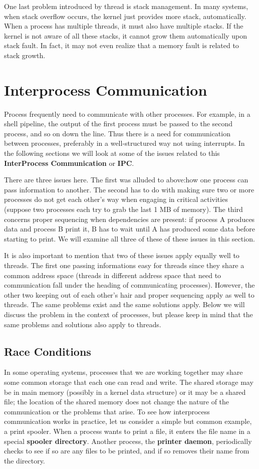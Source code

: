 \documentclass{book}
\newcommand {\kw}  [1] {\textbf{#1}}
\begin{document}
One last problem introduced by thread is stack management.
In many systems, when stack overflow occurs, the kernel just provides more stack, automatically.
When a process has multiple threads, it must also have multiple stacks.
If the kernel is not aware of all these stacks, it cannot grow them automatically upon stack fault.
In fact, it may not even realize that a memory fault is related to stack growth.
 
\section{Interprocess Communication}
Process frequently need to communicate with other processes.
For example, in a shell pipeline, the output of the first process must be passed to the second process, and so on down the line.
Thus there is a need for communication between processes, 
preferably in a well-structured way not using interrupts.
In the following sections we will look at some of the issues related to this \kw{InterProcess Communication} or \kw{IPC}.

There are three issues here.
The first was alluded to above:how one process can pass information to another.
The second has to do with making sure two or more processes do not get each other's way 
when engaging in critical activities (suppose two processes each try to grab the last 1 MB of memory).
The third concerns proper sequencing when dependencies are present: if process A produces data and process B print it, 
B has to wait until A has produced some data before starting to print.
We will examine all three of these of these issues in this section.

It is also important to mention that two of these issues apply equally well to threads.
The first one passing informations easy for threads since they share a common address space 
(threads in different address space that need to communication fall under the heading of communicating processes).
However, the other two keeping out of each other's hair and proper sequencing apply as well to threads.
The same problems exist and the same solutions apply.
Below we will discuss the problem in the context of processes,
but please keep in mind that the same problems and solutions also apply to threads.

\subsection{Race Conditions}
In some operating systems, processes that we are working together may share some common storage
that each one can read and write.
The shared storage may be in main memory (possibly in a kernel data structure) or it may be a shared file;
the location of the shared memory does not change the nature of the communication or the problems that arise.
To see how interprocess communication works in practice, let us consider a simple but common example, a print spooler.
When a process wants to print a file, it enters the file name in a special \kw{spooler directory}.
Another process, the \kw{printer daemon}, periodically checks to see if so are any files to be printed,
and if so removes their name from the directory.
\end{document}
